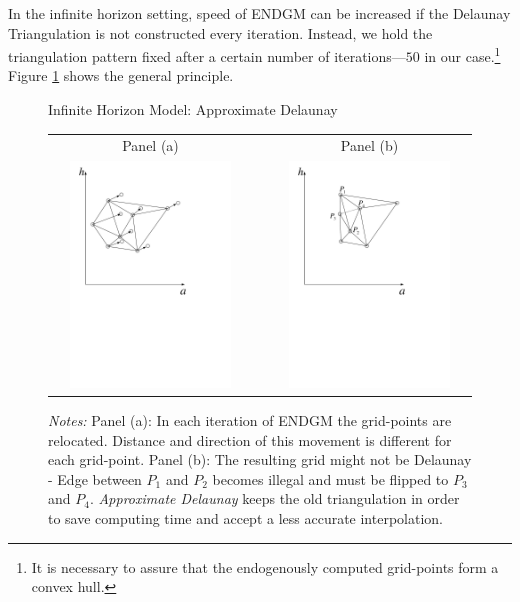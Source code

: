 \documentclass[a4paper,12pt]{article}
\begin{document}
In the infinite horizon setting, speed of ENDGM can be increased if the Delaunay Triangulation is not constructed every iteration. Instead, we hold the triangulation pattern fixed after a certain number of iterations---$50$ in our case.\footnote{It is necessary to assure that the endogenously computed grid-points form a convex hull.}
Figure \ref{graph_smart} shows the general principle. 
\begin{figure}[htbp] 
	\caption{Infinite Horizon Model: Approximate Delaunay}
	\label{graph_smart}
	\centering
	\begin{tabular}{cC{1cm}c}
	Panel (a) & & Panel (b)  \\
	\includegraphics[height=6.0cm, width=6.0cm]{Abbildungen/Smart_1.pdf} & & \includegraphics[height=6.0cm, width=6.0cm]{Abbildungen/Smart_2.pdf} \\
	\end{tabular}
	\caption*{\footnotesize{\emph{Notes:} Panel (a): In each iteration of ENDGM the grid-points are relocated. Distance and direction of this movement is different for each grid-point. Panel (b): The resulting grid might not be Delaunay - Edge between $P_{1}$ and $P_{2}$ becomes illegal and must be flipped to $P_{3}$ and $P_{4}$. \textit{Approximate Delaunay} keeps the old triangulation in order to save computing time and accept a less accurate interpolation.}}
\end{figure}
\end{document}
